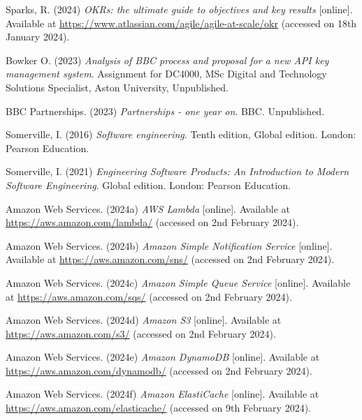 \noindent Sparks, R. (2024) \textit{OKRs: the ultimate guide to objectives and key results} [online]. Available at \url{https://www.atlassian.com/agile/agile-at-scale/okr} (accessed on 18th January 2024).
\vspace{0.2cm}

\noindent Bowker O. (2023) \textit{Analysis of BBC process and proposal for a new API key management system}. Assignment for DC4000, MSc Digital and Technology Solutions Specialist, Aston University, Unpublished.
\vspace{0.2cm}

\noindent BBC Partnerships. (2023) \textit{Partnerships - one year on}. BBC. Unpublished.
\vspace{0.2cm}

\noindent Somerville, I. (2016) \textit{Software engineering}. Tenth edition, Global edition. London: Pearson Education.
\vspace{0.2cm}

\noindent Somerville, I. (2021) \textit{Engineering Software Products: An Introduction to Modern Software Engineering}. Global edition. London: Pearson Education.
\vspace{0.2cm}

\noindent Amazon Web Services. (2024a) \textit{AWS Lambda} [online]. Available at \url{https://aws.amazon.com/lambda/} (accessed on 2nd February 2024).
\vspace{0.2cm}

\noindent Amazon Web Services. (2024b) \textit{Amazon Simple Notification Service} [online]. Available at \url{https://aws.amazon.com/sns/} (accessed on 2nd February 2024).
\vspace{0.2cm}

\noindent Amazon Web Services. (2024c) \textit{Amazon Simple Queue Service} [online]. Available at \url{https://aws.amazon.com/sqs/} (accessed on 2nd February 2024).
\vspace{0.2cm}

\noindent Amazon Web Services. (2024d) \textit{Amazon S3} [online]. Available at \url{https://aws.amazon.com/s3/} (accessed on 2nd February 2024).
\vspace{0.2cm}

\noindent Amazon Web Services. (2024e) \textit{Amazon DynamoDB} [online]. Available at \url{https://aws.amazon.com/dynamodb/} (accessed on 2nd February 2024).
\vspace{0.2cm}

\noindent Amazon Web Services. (2024f) \textit{Amazon ElastiCache} [online]. Available at \url{https://aws.amazon.com/elasticache/} (accessed on 9th February 2024).
\vspace{0.2cm}

